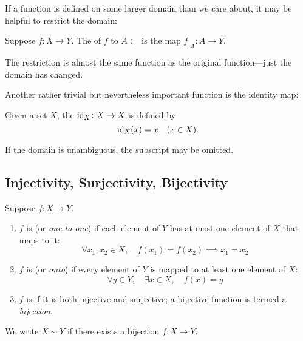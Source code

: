 If a function is defined on some larger domain than we care about, it may be helpful to restrict the domain:

\begin{definition}[Restriction]
Suppose $f\colon X\to Y$. The  of $f$ to $A\subset$ is the map $f|_A\colon A \to Y$.
\end{definition}

\begin{remark}
The restriction is almost the same function as the original function---just the domain has changed.
\end{remark}

Another rather trivial but nevertheless important function is the identity map:

\begin{definition}
Given a set $X$, the  $\operatorname{id}_X\colon X\to X$ is defined by
\[\operatorname{id}_X(x)=x\quad(x\in X).\]
\end{definition}

\begin{notation}
If the domain is unambiguous, the subscript may be omitted.
\end{notation}

\subsection{Injectivity, Surjectivity, Bijectivity}
\begin{definition}
Suppose $f\colon X\to Y$.
\begin{enumerate}[label=(\roman*)]
\item $f$ is  (or \emph{one-to-one}) if each element of $Y$ has at most one element of $X$ that maps to it:
\[\forall x_1,x_2\in X,\quad f(x_1)=f(x_2) \implies x_1=x_2\]

\item $f$ is  (or \emph{onto}) if every element of $Y$ is mapped to at least one element of $X$:
\[ \forall y\in Y,\quad\exists x\in X,\quad f(x)=y \]

\item $f$ is  if it is both injective and surjective; a bijective function is termed a \emph{bijection}.
\end{enumerate}
\end{definition}

\begin{notation}
We write $X\sim Y$ if there exists a bijection $f\colon X\to Y$.
\end{notation}
